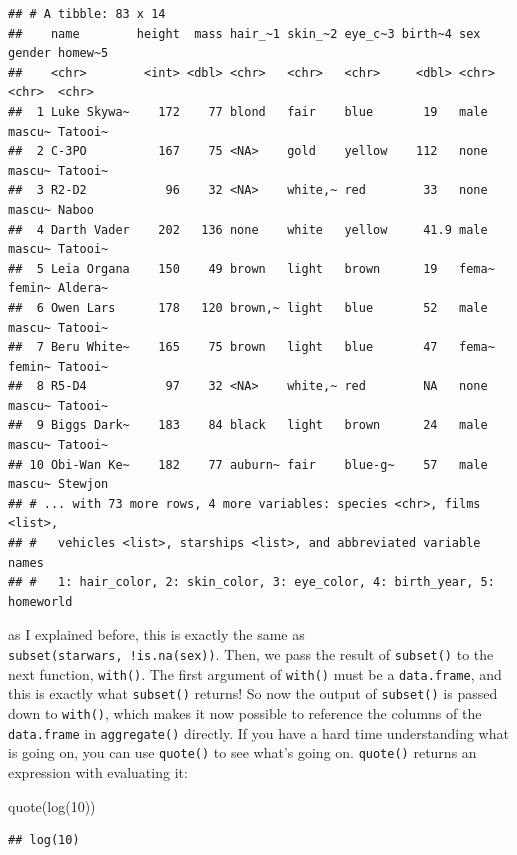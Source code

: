 \documentclass[
]{article}
\newenvironment{Shaded}{\begin{snugshade}}{\end{snugshade}}
\newcommand{\DecValTok}[1]{\textcolor[rgb]{0.00,0.00,0.81}{#1}}
\newcommand{\FunctionTok}[1]{\textcolor[rgb]{0.00,0.00,0.00}{#1}}
\newcommand{\NormalTok}[1]{#1}
\begin{document}
\begin{verbatim}
## # A tibble: 83 x 14
##    name        height  mass hair_~1 skin_~2 eye_c~3 birth~4 sex   gender homew~5
##    <chr>        <int> <dbl> <chr>   <chr>   <chr>     <dbl> <chr> <chr>  <chr>  
##  1 Luke Skywa~    172    77 blond   fair    blue       19   male  mascu~ Tatooi~
##  2 C-3PO          167    75 <NA>    gold    yellow    112   none  mascu~ Tatooi~
##  3 R2-D2           96    32 <NA>    white,~ red        33   none  mascu~ Naboo  
##  4 Darth Vader    202   136 none    white   yellow     41.9 male  mascu~ Tatooi~
##  5 Leia Organa    150    49 brown   light   brown      19   fema~ femin~ Aldera~
##  6 Owen Lars      178   120 brown,~ light   blue       52   male  mascu~ Tatooi~
##  7 Beru White~    165    75 brown   light   blue       47   fema~ femin~ Tatooi~
##  8 R5-D4           97    32 <NA>    white,~ red        NA   none  mascu~ Tatooi~
##  9 Biggs Dark~    183    84 black   light   brown      24   male  mascu~ Tatooi~
## 10 Obi-Wan Ke~    182    77 auburn~ fair    blue-g~    57   male  mascu~ Stewjon
## # ... with 73 more rows, 4 more variables: species <chr>, films <list>,
## #   vehicles <list>, starships <list>, and abbreviated variable names
## #   1: hair_color, 2: skin_color, 3: eye_color, 4: birth_year, 5: homeworld
\end{verbatim}

as I explained before, this is exactly the same as \texttt{subset(starwars,\ !is.na(sex))}. Then, we pass the result of
\texttt{subset()} to the next function, \texttt{with()}. The first argument of \texttt{with()} must be a \texttt{data.frame}, and this is exactly
what \texttt{subset()} returns! So now the output of \texttt{subset()} is passed down to \texttt{with()}, which makes it now possible
to reference the columns of the \texttt{data.frame} in \texttt{aggregate()} directly. If you have a hard time understanding what
is going on, you can use \texttt{quote()} to see what's going on. \texttt{quote()} returns an expression with evaluating it:

\begin{Shaded}
\begin{Highlighting}[]
\FunctionTok{quote}\NormalTok{(}\FunctionTok{log}\NormalTok{(}\DecValTok{10}\NormalTok{))}
\end{Highlighting}
\end{Shaded}

\begin{verbatim}
## log(10)
\end{verbatim}
\end{document}

